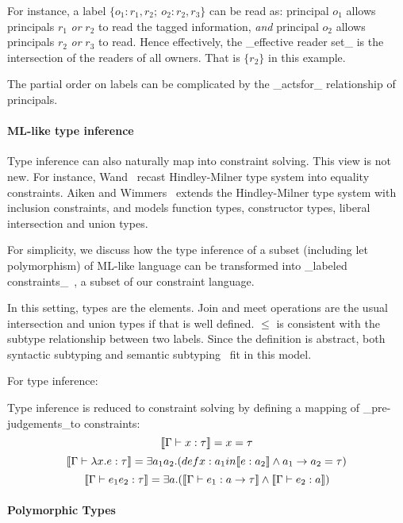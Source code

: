 For instance, a label $\{o_1:r_1,r_2;\ o_2:r_2,r_3\}$ can be read as: principal
$o_1$ allows principals $r_1$ \emph{or} $r_2$ to read the tagged information,
\emph{and} principal $o_2$ allows principals $r_2$ \emph{or} $r_3$ to read.
Hence effectively, the _effective reader set_ is the intersection of the
readers of all owners. That is $\{r_2\}$ in this example.

The partial order on labels can be complicated by the _actsfor_ relationship of
principals.

 
\paragraph{ML-like type inference}

Type inference can also naturally map into constraint solving. This
view is not new. For instance, Wand~\cite{wand-typeinference} recast
Hindley-Milner type system into equality constraints. Aiken and
Wimmers~\cite{aiken-typeinclusion} extends the Hindley-Milner type
system with inclusion constraints, and models function types,
constructor types, liberal intersection and union types. 

For simplicity, we discuss how the type inference of a subset
(including let polymorphism) of ML-like language can be transformed
into _labeled constraints_~\cite{haack:slicing}, a subset of our
constraint language.

In this setting, types are the elements. Join and
meet operations are the usual intersection and union types if that is
well defined.
$\leq$ is consistent with the subtype relationship between two labels.
Since the definition is abstract, both syntactic subtyping 
and semantic subtyping~\cite{aiken-typeinclusion} fit in this model.

For type inference:

Type inference is reduced to constraint solving by defining a mapping
of _pre-judgements_to constraints:
\[\llbracket \Gamma \vdash x:\tau \rrbracket = x =\tau\]
\[\llbracket \Gamma \vdash \lambda x.e:\tau \rrbracket = \exists a_1 a_2.
(def x: a_1 in \llbracket e:a_2 \rrbracket \land a_1 \rightarrow a_2 =\tau)\]
\[\llbracket \Gamma\vdash e_1 e_2 : \tau \rrbracket = \exists a.(\llbracket \Gamma \vdash
e_1:a\rightarrow \tau \rrbracket\land \llbracket \Gamma\vdash e_2:a \rrbracket)\]


\paragraph{Polymorphic Types}

